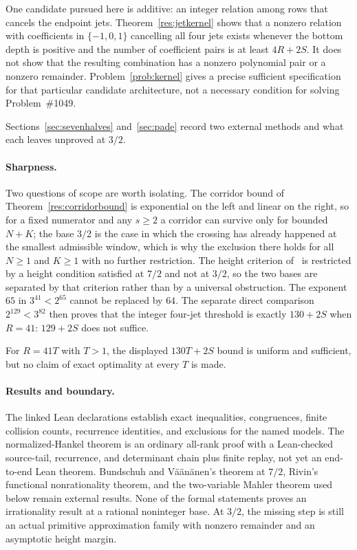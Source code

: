 \documentclass[11pt]{article}
\begin{document}
One candidate pursued here is additive: an
integer relation among rows that cancels the endpoint jets.
Theorem~\ref{res:jetkernel} shows that a nonzero relation with coefficients in
$\{-1,0,1\}$ cancelling all four jets exists whenever the bottom depth is
positive and the number of coefficient pairs is at least $4R+2S$.  It does not
show that the resulting combination has a nonzero polynomial pair or a nonzero
remainder.  Problem~\ref{prob:kernel} gives a precise sufficient specification
for that particular candidate architecture, not a necessary condition for
solving Problem~\#1049.

Sections~\ref{sec:sevenhalves} and~\ref{sec:pade} record two external methods
and what each leaves unproved at $3/2$.

\paragraph{Sharpness.}
Two questions of scope are worth isolating.  The corridor bound of
Theorem~\ref{res:corridorbound} is exponential on the left and linear on the
right, so for a fixed numerator and any $s\ge2$ a corridor can survive only for
bounded $N+K$; the base $3/2$ is the case in which the crossing has already
happened at the smallest admissible window, which is why the exclusion there
holds for all $N\ge1$ and $K\ge1$ with no further restriction.  The height
criterion of~\cite{bv1994} is restricted by a height condition satisfied at
$7/2$ and not at $3/2$, so the two bases are separated by that criterion rather
than by a universal obstruction.  The exponent $65$ in
$3^{41}<2^{65}$ cannot be replaced by $64$.  The separate direct comparison
$2^{129}<3^{82}$ then proves that the integer four-jet threshold is exactly
$130+2S$ when $R=41$: $129+2S$ does not suffice.

For $R=41T$ with $T>1$, the displayed $130T+2S$ bound is uniform and sufficient,
but no claim of exact optimality at every $T$ is made.

\statusboundary

\paragraph{Results and boundary.}
The linked Lean declarations establish exact inequalities, congruences,
finite collision counts, recurrence identities, and exclusions for the named
models.  The normalized-Hankel theorem is an ordinary all-rank proof with a
Lean-checked source-tail, recurrence, and determinant chain plus finite replay,
not yet an end-to-end Lean theorem.  Bundschuh and V\"a\"an\"anen's theorem at \(7/2\),
Rivin's functional nonrationality theorem, and the two-variable Mahler theorem
used below remain external results.  None of the formal statements proves an
irrationality result at a rational noninteger base.  At \(3/2\), the missing
step is still an actual primitive approximation family with nonzero remainder
and an asymptotic height margin.
\end{document}
